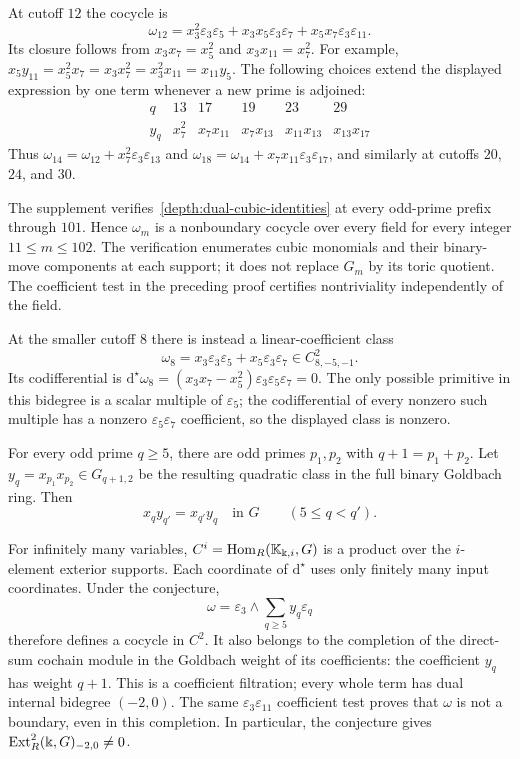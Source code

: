 \begin{example}\label{depth:dual-finite}
At cutoff $12$ the cocycle is
\[
 \omega_{12}=x_3^2\varepsilon_3\varepsilon_5
       +x_3x_5\varepsilon_3\varepsilon_7
       +x_5x_7\varepsilon_3\varepsilon_{11}.
\]
Its closure follows from $x_3x_7=x_5^2$ and $x_3x_{11}=x_7^2$.
For example,
$x_5y_{11}=x_5^2x_7=x_3x_7^2=x_3^2x_{11}=x_{11}y_5$.
The following choices extend the displayed expression by one term
whenever a new prime is adjoined:
\[
\begin{array}{c|ccccc}
 q&13&17&19&23&29\\ \hline
 y_q&x_7^2&x_7x_{11}&x_7x_{13}&x_{11}x_{13}&x_{13}x_{17}
\end{array}
\]
Thus $\omega_{14}=\omega_{12}+x_7^2\varepsilon_3\varepsilon_{13}$ and
$\omega_{18}=\omega_{14}+x_7x_{11}\varepsilon_3\varepsilon_{17}$, and
similarly at cutoffs $20$, $24$, and $30$.

The supplement verifies~\eqref{depth:dual-cubic-identities} at every
odd-prime prefix through $101$. Hence $\omega_m$ is a nonboundary cocycle
over every field for every integer $11\le m\le102$.
The verification enumerates cubic monomials and their binary-move
components at each support; it does not replace $G_m$ by its toric
quotient. The coefficient test in the preceding proof certifies
nontriviality independently of the field.

At the smaller cutoff $8$ there is instead a linear-coefficient class
\[
 \omega_8=x_3\varepsilon_3\varepsilon_5+x_5\varepsilon_3\varepsilon_7
       \in C^2_{8,-5,-1}.
\]
Its codifferential is
$\mathrm{d}^\star\omega_8=(x_3x_7-x_5^2)\varepsilon_3\varepsilon_5\varepsilon_7=0$.
The only possible primitive in this bidegree is a scalar multiple
of $\varepsilon_5$; the codifferential of every nonzero such multiple
has a nonzero $\varepsilon_5\varepsilon_7$ coefficient, so the displayed class is
nonzero.
\end{example}

\begin{conjecture}\label{depth:dual-conjecture}
For every odd prime $q\ge5$, there are odd primes $p_1,p_2$ with
$q+1=p_1+p_2$. Let $y_q=x_{p_1}x_{p_2}\in G_{q+1,2}$ be the
resulting quadratic class in the full binary Goldbach ring. Then
\[
 x_qy_{q'}=x_{q'}y_q\quad\text{in }G\qquad(5\le q<q').
\]
\end{conjecture}

For infinitely many variables,
$C^i=\operatorname{Hom}_R(\mathbb K_{\Bbbk,i},G)$ is a product over
the $i$-element exterior supports. Each coordinate of $\mathrm{d}^\star$ uses
only finitely many input coordinates. Under the conjecture,
\[
 \omega=\varepsilon_3\wedge\sum_{q\ge5}y_q\varepsilon_q
\]
therefore defines a cocycle in $C^2$. It also belongs to the
completion of the direct-sum cochain module in the Goldbach weight
of its coefficients: the coefficient $y_q$ has weight $q+1$.
This is a coefficient filtration; every whole term has dual internal
bidegree $(-2,0)$. The same $\varepsilon_3\varepsilon_{11}$
coefficient test proves that $\omega$ is not a boundary, even in this
completion. In particular, the conjecture gives
$\operatorname{Ext}_R^2(\Bbbk,G)_{-2,0}\ne0$.

